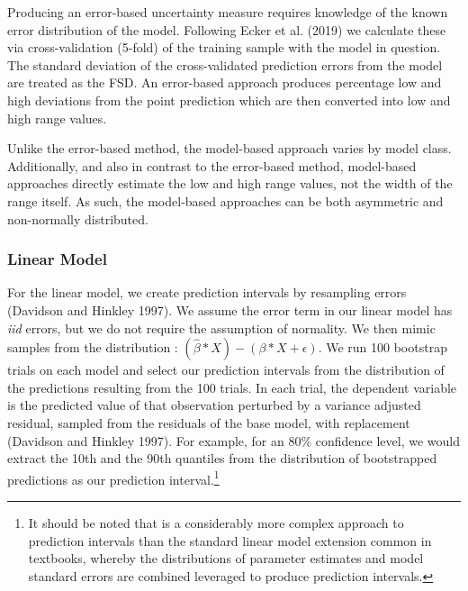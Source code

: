 \documentclass[colTwo]{format}
\theoremstyle{definition}
\begin{document}
Producing an error-based uncertainty measure requires knowledge of the known error distribution of the model.  Following Ecker et al. (2019) we calculate these via cross-validation (5-fold) of the training sample with the model in question.  The standard deviation of the cross-validated prediction errors from the model are treated as the FSD.  An error-based approach produces percentage low and high deviations from the point prediction which are then converted into low and high range values.  

Unlike the error-based method, the model-based approach varies by model class. Additionally, and also in contrast to the error-based method, model-based approaches directly estimate the low and high range values, not the width of the range itself. As such, the model-based approaches can be both asymmetric and non-normally distributed. 

\subsubsection{Linear Model}

For the linear model, we create prediction intervals by resampling errors (Davidson and Hinkley 1997). We assume the error term in our linear model has \textit{iid} errors, but we do not require the assumption of normality. We then mimic samples from the distribution : \((\widehat{\beta}*X) - (\beta*X + \epsilon)\). We run 100 bootstrap trials on each model and select our prediction intervals from the distribution of the predictions resulting from the 100 trials. In each trial, the dependent variable is the predicted value of that observation perturbed by a variance adjusted residual, sampled from the residuals of the base model, with replacement (Davidson and Hinkley 1997).  For example, for an 80\% confidence level, we would extract the 10th and the 90th quantiles from the distribution of bootstrapped predictions as our prediction interval.\footnote{It should be noted that is a considerably more complex approach to prediction intervals than the standard linear model extension common in textbooks, whereby the distributions of parameter estimates and model standard errors are combined leveraged to produce prediction intervals.}  
\end{document}
